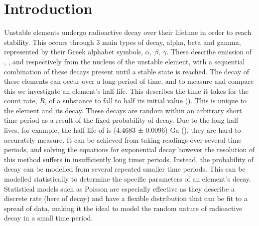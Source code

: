 \documentclass[11pt]{article}
\begin{document}
    \section{Introduction}
    Unstable elements undergo radioactive decay over their lifetime in order to reach stability. This occurs through 3 main types of decay, alpha, beta and gamma, represented by their Greek alphabet symbols, $\alpha,\  \beta,\ \gamma$.  These describe emission of , , and  respectively from the nucleus of the unstable element, with a sequential combination of these decays present until a stable state is reached. The decay of these elements can occur over a long period of time, and to measure and compare this we investigate an element's half life. This describes the time it takes for the count rate, $R$, of a substance to fall to half its initial value (\cite{Magill2005}). This is unique to the element and its decay.
    These decays are random within an arbitrary short time period as a result of the fixed probability of decay. Due to the long half lives, for example, the half life of  is (4.4683 ± 0.0096) Ga (\cite{U238}), they are hard to accurately measure.  It can be achieved from taking readings over several time periods, and solving the equations for exponential decay however the resolution of this method suffers in insufficiently long timer periods. Instead, the probability of decay can be modelled from several repeated smaller time periods. This can be modelled statistically to determine the  specific parameters of an element's decay. Statistical models such as Poisson are especially effective as they describe a discrete rate (here of decay) and have a flexible distribution that can be fit to a spread of data, making it the ideal to model the random nature of radioactive decay in a small time period. 
    
\end{document}
